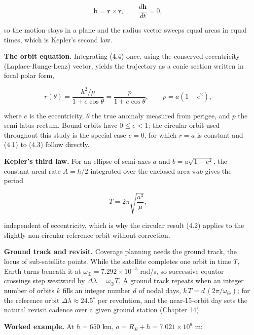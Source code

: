 \documentclass[
  11pt,
  openany,
  oneside]{book}
\begin{document}
\begin{equation}
\mathbf h = \mathbf r \times \dot{\mathbf r}, \qquad \frac{d\mathbf h}{dt} = 0, \tag{4.5}
\end{equation}

so the motion stays in a plane and the radius vector sweeps equal areas
in equal times, which is Kepler's second law.

\textbf{The orbit equation.} Integrating (4.4) once, using the conserved
eccentricity (Laplace-Runge-Lenz) vector, yields the trajectory as a
conic section written in focal polar form,

\begin{equation}
r(\theta) = \frac{h^{2}/\mu}{1 + e\cos\theta} = \frac{p}{1 + e\cos\theta}, \qquad p = a\left(1 - e^{2}\right), \tag{4.6}
\end{equation}

where \(e\) is the eccentricity, \(\theta\) the true anomaly measured
from perigee, and \(p\) the semi-latus rectum. Bound orbits have
\(0 \le e < 1\); the circular orbit used throughout this study is the
special case \(e = 0\), for which \(r = a\) is constant and (4.1) to
(4.3) follow directly.

\textbf{Kepler's third law.} For an ellipse of semi-axes \(a\) and
\(b = a\sqrt{1-e^{2}}\), the constant areal rate \(\dot A = h/2\)
integrated over the enclosed area \(\pi a b\) gives the period

\begin{equation}
T = 2\pi\sqrt{\frac{a^{3}}{\mu}}, \tag{4.7}
\end{equation}

independent of eccentricity, which is why the circular result (4.2)
applies to the slightly non-circular reference orbit without correction.

\textbf{Ground track and revisit.} Coverage planning needs the ground
track, the locus of sub-satellite points. While the satellite completes
one orbit in time \(T\), Earth turns beneath it at
\(\omega_\oplus = 7.292\times10^{-5}\) rad/s, so successive equator
crossings step westward by \(\Delta\lambda = \omega_\oplus T\). A ground
track repeats when an integer number of orbits \(k\) fills an integer
number \(d\) of nodal days, \(k\,T = d\,(2\pi/\omega_\oplus)\); for the
reference orbit \(\Delta\lambda \approx 24.5^\circ\) per revolution, and
the near-15-orbit day sets the natural revisit cadence over a given
ground station (Chapter 14).

\textbf{Worked example.} At \(h = 650\) km,
\(a = R_E + h = 7.021\times10^6\) m:
\end{document}
